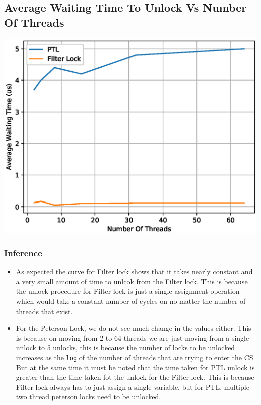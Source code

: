 \documentclass[a4paper,12pt]{report}
\begin{document}
\subsection{Average Waiting Time To Unlock Vs Number Of Threads}
\begin{center}
\includegraphics[scale=0.7]{./we.eps}
\end{center}
\subsubsection{Inference}
\begin{itemize}
\item As expected the curve for Filter lock shows that it takes nearly constant and a very small amount of time to unlcok from the Filter lock. This is because the unlock procedure for Filter lock is just a single assignment operation which would take a constant number of cycles on no matter the number of threads that exist.
\item For the Peterson Lock, we do not see much change in the values either. This is because on moving from 2 to 64 threads we are just moving from a single unlock to 5 unlocks, this is because the number of locks to be unlocked increases as the \texttt{log} of the number of threads that are trying to enter the CS. But at the same time it must be noted that the time taken for PTL unlock is greater than the time taken fot the unlock for the Filter lock. This is because Filter lock always has to just assign a single variable, but for PTL, multiple two thread peterson locks need to be unlocked.
\end{itemize}
\end{document}
